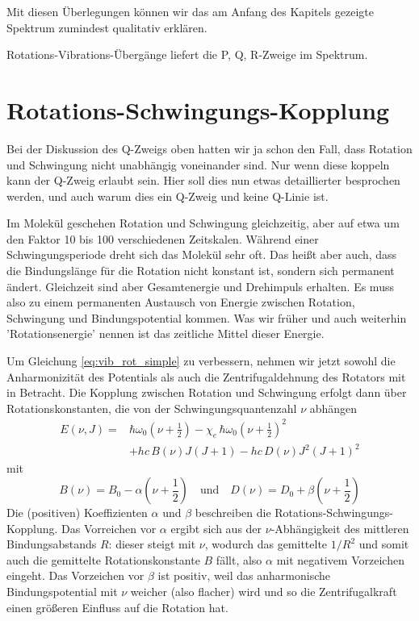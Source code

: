 Mit diesen Überlegungen können wir das am Anfang des Kapitels gezeigte Spektrum zumindest qualitativ erklären.


\begin{marginfigure}
\caption{Rotations-Vibrations-Übergänge liefert die P, Q, R-Zweige im Spektrum.}
\end{marginfigure}
 
 
\section{Rotations-Schwingungs-Kopplung}

Bei der Diskussion des Q-Zweigs oben hatten wir ja schon den Fall, dass Rotation und Schwingung nicht unabhängig voneinander sind. Nur wenn diese koppeln kann der Q-Zweig erlaubt sein. Hier soll dies nun etwas detaillierter besprochen werden, und auch warum dies ein Q-Zweig und keine Q-Linie ist.

Im Molekül geschehen Rotation und Schwingung gleichzeitig, aber auf etwa um den Faktor 10 bis 100 verschiedenen Zeitskalen. Während einer Schwingungsperiode dreht sich das Molekül sehr oft. Das heißt aber auch, dass die Bindungslänge für die Rotation nicht konstant ist, sondern sich permanent ändert. Gleichzeit sind aber Gesamtenergie und Drehimpuls erhalten. Es muss also zu einem permanenten Austausch von Energie zwischen Rotation, Schwingung und Bindungspotential kommen. Was wir früher und auch weiterhin 'Rotationsenergie' nennen ist das zeitliche Mittel dieser Energie.

Um Gleichung \ref{eq:vib_rot_simple} zu verbessern, nehmen wir jetzt sowohl die Anharmonizität des Potentials als auch die Zentrifugaldehnung des Rotators mit in Betracht. Die Kopplung zwischen Rotation und Schwingung erfolgt dann über Rotationskonstanten, die von der Schwingungsquantenzahl $\nu$ abhängen
\begin{align}
 E(\nu, J) = & \hbar \omega_0 \left( \nu  + \frac{1}{2} \right)
 - \chi_e \, \hbar \omega_0  \left( \nu  + \frac{1}{2} \right)^2 \\
 & + h c \, B(\nu) J (J+1) - h c \, D(\nu) J^2 (J+1)^2  \nonumber
\end{align}
mit
\begin{equation}
B(\nu) = B_0 - \alpha \left(\nu + \frac{1}{2} \right) \quad \text{und} \quad
D(\nu) = D_0 + \beta \left(\nu + \frac{1}{2} \right) 
\end{equation}
Die (positiven) Koeffizienten $\alpha$ und $\beta$ beschreiben die  Rotations-Schwingungs-Kopplung. Das Vorreichen vor $\alpha$ ergibt sich aus der $\nu$-Abhängigkeit des mittleren Bindungsabstands $R$: dieser steigt mit $\nu$, wodurch das gemittelte $1/R^2$ und somit auch die gemittelte Rotationskonstante $B$ fällt, also $\alpha$ mit negativem Vorzeichen eingeht. Das Vorzeichen vor $\beta$ ist positiv, weil das anharmonische Bindungspotential mit $\nu$ weicher (also flacher) wird und so die Zentrifugalkraft einen größeren Einfluss auf die Rotation hat.


